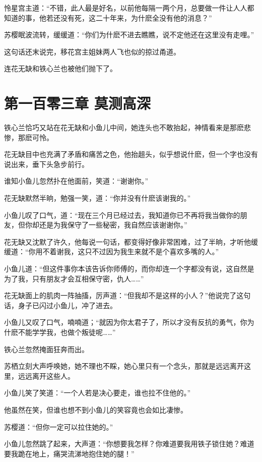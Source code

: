 \documentclass[12pt,oneside]{book}
\begin{document}
怜星宫主道：``不错，此人最是好名，以前他每隔一两个月，总要做一件让人人都知道的事，他若还没有死，这二十年来，为什麽全没有他的消息？''

苏樱眠波流转，缓缓道：``你们为什麽不进去瞧瞧，说不定他还在这里没有走哩。''

这句话还末说完，移花宫主姐妹两人飞也似的掠过甬道。

连花无缺和铁心兰也被他们抛下了。

\hypertarget{ux7b2cux4e00ux767eux96f6ux4e09ux7ae0-ux83abux6d4bux9ad8ux6df1}{%
\chapter{第一百零三章
莫测高深}\label{ux7b2cux4e00ux767eux96f6ux4e09ux7ae0-ux83abux6d4bux9ad8ux6df1}}

铁心兰恰巧又站在花无缺和小鱼儿中间，她连头也不敢抬起，神情看来是那麽悲惨，那麽可怜。

花无缺目中也充满了矛盾和痛苦之色，他抬趄头，似乎想说什麽，但一个字也没有说出来，垂下头急步前行。

谁知小鱼儿忽然扑在他面前，笑道：``谢谢你。''

花无缺默然半晌，勉强一笑，道：``你并没有什麽该谢我的。''

小鱼儿叹了口气，道：``现在三个月已经过去，我知道你已不再将我当做你的朋友，但你却还是为我保守了一些秘密，我自然应该谢谢你。''

花无缺又沈默了许久，他每说一句话，都变得好像非常困难，过了半晌，才听他缓缓道：``你用不着谢我，这只不过因为我生来就不是个喜欢多嘴的人。''

小鱼儿道：``但这件事你本该告诉你师傅的，而你却连一个字都没有说，这自然是为了我，只有朋友才会互相保守密，仇人\ldots\ldots{}''

花无缺面上的肌肉一阵抽搐，厉声道：``但我却不是这样的小人？''他说完了这句话，身子已闪过小鱼儿，冲了进去。

小鱼儿又叹了口气，喃喃道；``就因为你太君子了，所以才没有反抗的勇气，你为什麽不能学学我，也做个叛徒呢\ldots\ldots{}''

铁心兰忽然掩面狂奔而出。

苏栖立刻大声呼唤她，她不理也不睬，她心里只有一个念头，那就是远远离开这里，远远离开这些人。

小鱼儿笑了笑道：``一个人若是决心要走，谁也拉不住他的。''

他虽然在笑，但谁也想不到小鱼儿的笑容竟也会如比凄惨。

苏樱道：``但你一定可以拉住她的。''

小鱼儿忽然跳了起来，大声道：``你想要我怎样？你难道要我用铁子锁住她？难道要我跪在地上，痛哭流涕地抱住她的腿！''
\end{document}
